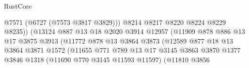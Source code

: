 \begin{lexlean}{RustCore}
\begin{coremodule}
                                                @7571
                                                (@6727 (@7573 @3817 @3829)))
                                              @8214
                                              @8217
                                              @8220
                                              @8224
                                              @8229
                                              @8235))
                                          (@13124
                                            @887
                                            @13
                                            @18
                                            @2020
                                            @3914
                                            @12957
                                            (@11909
                                              @878
                                              @886
                                              @13
                                              @17
                                              @3875
                                              @3913
                                              (@11772
                                                @878
                                                @13
                                                @3864
                                                @3873
                                                (@12589
                                                  @877
                                                  @18
                                                  @13
                                                  @3864
                                                  @3871
                                                  @1572
                                                  (@11655
                                                    @771
                                                    @789
                                                    @13
                                                    @17
                                                    @3145
                                                    @3863
                                                    @3870
                                                    @1377
                                                    @3846
                                                    @1318
                                                    (@11690 @770 @3145 @11593 @11597)
                                                    (@11810
                                                      @3856

\end{coremodule}
\end{lexlean}
